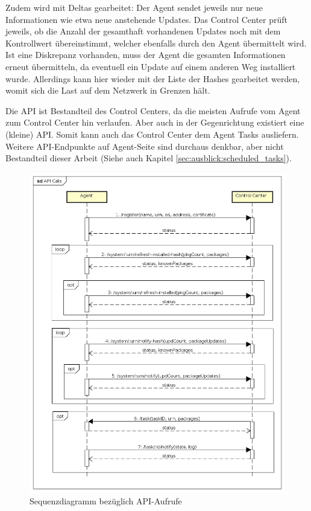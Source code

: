 Zudem wird mit Deltas gearbeitet: Der Agent sendet jeweils nur neue Informationen wie etwa neue anstehende Updates. Das Control Center prüft jeweils, ob die Anzahl der gesamthaft vorhandenen Updates noch mit dem Kontrollwert übereinstimmt, welcher ebenfalls durch den Agent übermittelt wird. Ist eine Diskrepanz vorhanden, muss der Agent die gesamten Informationen erneut übermitteln, da eventuell ein Update auf einem anderen Weg installiert wurde. Allerdings kann hier wieder mit der Liste der Hashes gearbeitet werden, womit sich die Last auf dem Netzwerk in Grenzen hält.

Die API ist Bestandteil des Control Centers, da die meisten Aufrufe vom Agent zum Control Center hin verlaufen. Aber auch in der Gegenrichtung existiert eine (kleine) API. Somit kann auch das Control Center dem Agent Tasks ausliefern. Weitere API-Endpunkte auf Agent-Seite sind durchaus denkbar, aber nicht Bestandteil dieser Arbeit (Siehe auch Kapitel \ref{sec:ausblick:scheduled_tasks}).

\clearpage

\begin{figure}
  \centering
    \includegraphics[width=\textwidth]{files/API_Calls}
  \caption{Sequenzdiagramm bezüglich API-Aufrufe}
  \label{fig:api_sequence_diagram}
\end{figure}

